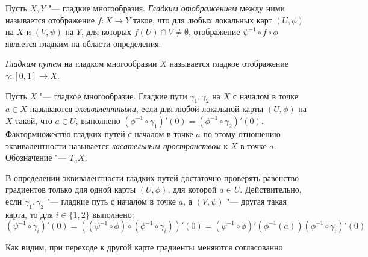 \begin{definition}
	Пусть $X, Y$ "--- гладкие многообразия. \textit{Гладким отображением} между ними называется отображение $f: X \to Y$ такое, что для любых локальных карт $(U, \phi)$ на $X$ и $(V, \psi)$ на $Y$, для которых $f(U) \cap V \ne \emptyset$, отображение $\psi^{-1} \circ f \circ \phi$ является гладким на области определения.
\end{definition}

\begin{definition}
	\textit{Гладким путем} на гладком многообразии $X$ называется гладкое отображение $\gamma : [0, 1] \to X$.
\end{definition}

\begin{definition}
	Пусть $X$ "--- гладкое многообразие. Гладкие пути $\gamma_1, \gamma_2$ на $X$ с началом в точке $a \in X$ называются \textit{эквивалентными}, если для любой локальной карты $(U, \phi)$ на $X$ такой, что $a \in U$, выполнено $(\phi^{-1} \circ \gamma_1)'(0) = (\phi^{-1} \circ \gamma_2)'(0)$. Фактормножество гладких путей с началом в точке $a$ по этому отношению эквивалентности называется \textit{касательным пространством} к $X$ в точке $a$. Обозначение "--- $T_aX$.
\end{definition}

\begin{note}
	В определении эквивалентности гладких путей достаточно проверять равенство градиентов только для одной карты $(U, \phi)$, для которой $a \in U$. Действительно, если $\gamma_1, \gamma_2$ "--- гладкие путь с началом в точке $a$, а $(V, \psi)$ "--- другая такая карта, то для $i \in \{1, 2\}$ выполнено:
	\[(\psi^{-1} \circ \gamma_i)'(0) = ((\psi^{-1} \circ \phi) \circ (\phi^{-1} \circ \gamma_i))'(0) = (\psi^{-1} \circ \phi)'(\phi^{-1}(a))(\phi^{-1} \circ \gamma_i)'(0)\]
	
	Как видим, при переходе к другой карте градиенты меняются согласованно.
\end{note}